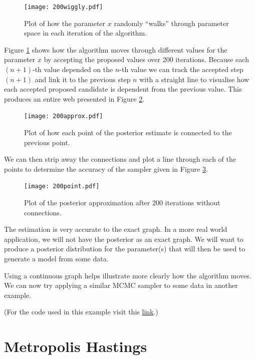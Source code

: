 \documentclass[12pt,twoside]{report}   %
\begin{document}
\begin{figure}[H]
\centering
\texttt{[image: 200wiggly.pdf]}
\caption{Plot of how the parameter $x$ randomly ``walks'' through parameter space in each iteration of the algorithm.}
\label{fig1.3}
\end{figure}

Figure \ref{fig1.3} shows how the algorithm moves through different values for the parameter $x$ by accepting the proposed values over 200 iterations. Because each $(n+1)$-th value depended on the $n$-th value we can track the accepted step $(n+1)$ and link it to the previous step $n$ with a straight line to visualise how each accepted proposed candidate is dependent from the previous value. This produces an entire web presented in Figure \ref{fig1.4}.
\begin{figure}[H]
\centering
\texttt{[image: 200approx.pdf]}
\caption{Plot of how each point of the posterior estimate is connected to the previous point.}
\label{fig1.4}
\end{figure}

We can then strip away the connections and plot a line through each of the points to determine the accuracy of the sampler given in Figure \ref{fig1.5}.
\begin{figure}[H]
\centering
\texttt{[image: 200point.pdf]}
\caption{Plot of the posterior approximation after 200 iterations without connections.}
\label{fig1.5}
\end{figure}

The estimation is very accurate to the exact graph. In a more real world application, we will not have the posterior as an exact graph. We will want to produce a posterior distribution for the parameter(s) that will then be used to generate a model from some data. 

Using a continuous graph helps illustrate more clearly how the algorithm moves. We can now try applying a similar MCMC sampler to some data in another example.

(For the code used in this example visit this \href{https://github.com/iMikeT/MathProject2/tree/master/R%20Code/Metropolis/Metropolis%20Example}{link}.)
\pagebreak
\section{Metropolis Hastings}\label{Metropolis Hastings}
\vspace{-0.4in}
\underline{\hspace{6.2in}}
\vspace{-0.1in}
\end{document}
